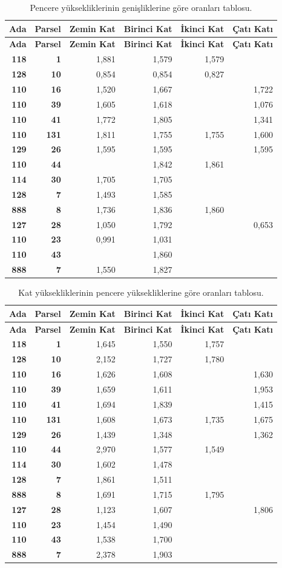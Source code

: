 \documentclass[12pt,turkish,a4paperpaper,]{report}
\begin{document}
\begin{longtable}[]{@{}rrrrrr@{}}
\caption{Pencere yüksekliklerinin genişliklerine göre oranları
tablosu.}\tabularnewline
\toprule
\textbf{Ada} & \textbf{Parsel} & \textbf{Zemin Kat} & \textbf{Birinci
Kat} & \textbf{İkinci Kat} & \textbf{Çatı Katı}\tabularnewline
\midrule
\endfirsthead
\toprule
\textbf{Ada} & \textbf{Parsel} & \textbf{Zemin Kat} & \textbf{Birinci
Kat} & \textbf{İkinci Kat} & \textbf{Çatı Katı}\tabularnewline
\midrule
\endhead
\textbf{118} & \textbf{1} & 1,881 & 1,579 & 1,579 &\tabularnewline
\textbf{128} & \textbf{10} & 0,854 & 0,854 & 0,827 &\tabularnewline
\textbf{110} & \textbf{16} & 1,520 & 1,667 & & 1,722\tabularnewline
\textbf{110} & \textbf{39} & 1,605 & 1,618 & & 1,076\tabularnewline
\textbf{110} & \textbf{41} & 1,772 & 1,805 & & 1,341\tabularnewline
\textbf{110} & \textbf{131} & 1,811 & 1,755 & 1,755 &
1,600\tabularnewline
\textbf{129} & \textbf{26} & 1,595 & 1,595 & & 1,595\tabularnewline
\textbf{110} & \textbf{44} & & 1,842 & 1,861 &\tabularnewline
\textbf{114} & \textbf{30} & 1,705 & 1,705 & &\tabularnewline
\textbf{128} & \textbf{7} & 1,493 & 1,585 & &\tabularnewline
\textbf{888} & \textbf{8} & 1,736 & 1,836 & 1,860 &\tabularnewline
\textbf{127} & \textbf{28} & 1,050 & 1,792 & & 0,653\tabularnewline
\textbf{110} & \textbf{23} & 0,991 & 1,031 & &\tabularnewline
\textbf{110} & \textbf{43} & & 1,860 & &\tabularnewline
\textbf{888} & \textbf{7} & 1,550 & 1,827 & &\tabularnewline
\bottomrule
\end{longtable}

\begin{longtable}[]{@{}rrrrrr@{}}
\caption{Kat yüksekliklerinin pencere yüksekliklerine göre oranları
tablosu.}\tabularnewline
\toprule
\textbf{Ada} & \textbf{Parsel} & \textbf{Zemin Kat} & \textbf{Birinci
Kat} & \textbf{İkinci Kat} & \textbf{Çatı Katı}\tabularnewline
\midrule
\endfirsthead
\toprule
\textbf{Ada} & \textbf{Parsel} & \textbf{Zemin Kat} & \textbf{Birinci
Kat} & \textbf{İkinci Kat} & \textbf{Çatı Katı}\tabularnewline
\midrule
\endhead
\textbf{118} & \textbf{1} & 1,645 & 1,550 & 1,757 &\tabularnewline
\textbf{128} & \textbf{10} & 2,152 & 1,727 & 1,780 &\tabularnewline
\textbf{110} & \textbf{16} & 1,626 & 1,608 & & 1,630\tabularnewline
\textbf{110} & \textbf{39} & 1,659 & 1,611 & & 1,953\tabularnewline
\textbf{110} & \textbf{41} & 1,694 & 1,839 & & 1,415\tabularnewline
\textbf{110} & \textbf{131} & 1,608 & 1,673 & 1,735 &
1,675\tabularnewline
\textbf{129} & \textbf{26} & 1,439 & 1,348 & & 1,362\tabularnewline
\textbf{110} & \textbf{44} & 2,970 & 1,577 & 1,549 &\tabularnewline
\textbf{114} & \textbf{30} & 1,602 & 1,478 & &\tabularnewline
\textbf{128} & \textbf{7} & 1,861 & 1,511 & &\tabularnewline
\textbf{888} & \textbf{8} & 1,691 & 1,715 & 1,795 &\tabularnewline
\textbf{127} & \textbf{28} & 1,123 & 1,607 & & 1,806\tabularnewline
\textbf{110} & \textbf{23} & 1,454 & 1,490 & &\tabularnewline
\textbf{110} & \textbf{43} & 1,538 & 1,700 & &\tabularnewline
\textbf{888} & \textbf{7} & 2,378 & 1,903 & &\tabularnewline
\bottomrule
\end{longtable}
\end{document}
